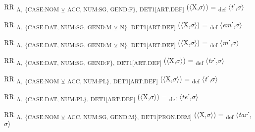 {\begin{exe}
 RR \textsubscript{A,} \textsubscript{\{CASE:NOM} \textsubscript{${\veebar}$}\textsubscript{ ACC, NUM:SG, GEND:F\},} \textsubscript{DET1[ART.DEF]} ($\langle$X,$\sigma $$\rangle$) = \textsubscript{def} $\langle$\textit{t}ˊ,$\sigma $$\rangle$
\end{exe}

\begin{exe}
 RR \textsubscript{A,} \textsubscript{\{CASE:DAT, NUM:SG, GEND:M} \textsubscript{${\veebar}$}\textsubscript{ N\},} \textsubscript{DET1[ART.DEF]} ($\langle$X,$\sigma $$\rangle$) = \textsubscript{def} $\langle$\textit{em}ˊ,$\sigma $$\rangle$
\end{exe}

\begin{exe}
 RR \textsubscript{A,} \textsubscript{\{CASE:DAT, NUM:SG, GEND:M} \textsubscript{${\veebar}$}\textsubscript{ N\},} \textsubscript{DET1[ART.DEF]} ($\langle$X,$\sigma $$\rangle$) = \textsubscript{def} $\langle$\textit{m}ˊ,$\sigma $$\rangle$
\end{exe}

\begin{exe}
 RR \textsubscript{A,} \textsubscript{\{CASE:DAT, NUM:SG, GEND:F\},} \textsubscript{DET1[ART.DEF]} ($\langle$X,$\sigma $$\rangle$) = \textsubscript{def} $\langle$\textit{tr}ˊ,$\sigma $$\rangle$
\end{exe}

\begin{exe}
 RR \textsubscript{A,} \textsubscript{\{CASE:NOM} \textsubscript{${\veebar}$}\textsubscript{ ACC, NUM:PL\},} \textsubscript{DET1[ART.DEF]} ($\langle$X,$\sigma $$\rangle$) = \textsubscript{def} $\langle$\textit{t}ˊ,$\sigma $$\rangle$
\end{exe}

\begin{exe}
 RR \textsubscript{A,} \textsubscript{\{CASE:DAT, NUM:PL\},} \textsubscript{DET1[ART.DEF]} ($\langle$X,$\sigma $$\rangle$) = \textsubscript{def} $\langle$\textit{te}ˊ,$\sigma $$\rangle$
\end{exe}

\begin{exe}
 RR \textsubscript{A,} \textsubscript{\{CASE:NOM} \textsubscript{${\veebar}$}\textsubscript{ ACC, NUM:SG, GEND:M\},} \textsubscript{DET1[PRON.DEM]} ($\langle$X,$\sigma $$\rangle$) = \textsubscript{def} $\langle$\textit{tar}ˊ,$\sigma $$\rangle$
\end{exe}

}
